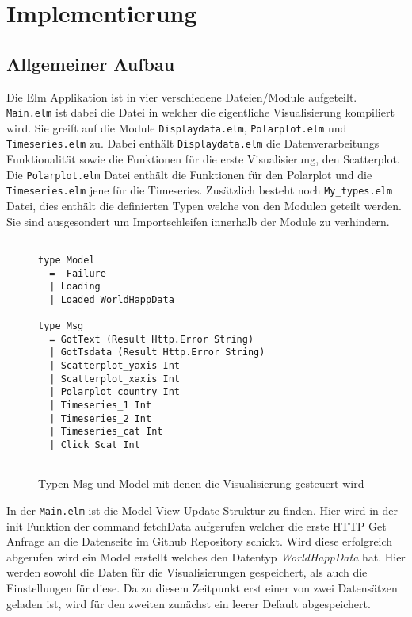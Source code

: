 \section{Implementierung}
\subsection{Allgemeiner Aufbau}
Die Elm Applikation ist in vier verschiedene Dateien/Module aufgeteilt. \texttt{Main.elm} ist dabei die Datei in welcher die eigentliche Visualisierung kompiliert wird. 
Sie greift auf die Module \texttt{Displaydata.elm}, \texttt{Polarplot.elm} und \texttt{Timeseries.elm} zu. 
Dabei enthält \texttt{Displaydata.elm} die Datenverarbeitungs Funktionalität sowie die Funktionen für die erste Visualisierung, den Scatterplot. 
Die \texttt{Polarplot.elm} Datei enthält die Funktionen für den Polarplot 
und die \break \texttt{Timeseries.elm} jene für die Timeseries.  Zusätzlich besteht noch \texttt{My\_types.elm} Datei, dies enthält die definierten Typen welche von den Modulen geteilt werden. Sie sind ausgesondert um Importschleifen innerhalb der Module zu verhindern.\\

\begin{figure}[ht]
\centering
\begin{mdframed}[backgroundcolor=backcolour]
\begin{verbatim}

type Model 
  =  Failure
  | Loading
  | Loaded WorldHappData

type Msg
  = GotText (Result Http.Error String)
  | GotTsdata (Result Http.Error String)
  | Scatterplot_yaxis Int
  | Scatterplot_xaxis Int
  | Polarplot_country Int
  | Timeseries_1 Int
  | Timeseries_2 Int
  | Timeseries_cat Int
  | Click_Scat Int
  
\end{verbatim}
\end{mdframed}
    \caption{Typen Msg und Model mit denen die Visualisierung gesteuert wird}
    \label{fig:Msg_Model}
\end{figure}

In der \texttt{Main.elm} ist die Model View Update Struktur zu finden. 
Hier wird in der init Funktion der command fetchData aufgerufen welcher die erste HTTP Get Anfrage an die Datenseite im Github Repository schickt. 
Wird diese erfolgreich abgerufen wird ein Model erstellt welches den Datentyp \textit{WorldHappData} hat. 
Hier werden sowohl die Daten für die Visualisierungen gespeichert, als auch die Einstellungen für diese. Da zu diesem Zeitpunkt erst einer von zwei Datensätzen geladen ist, wird für den zweiten zunächst ein leerer Default abgespeichert. \\

